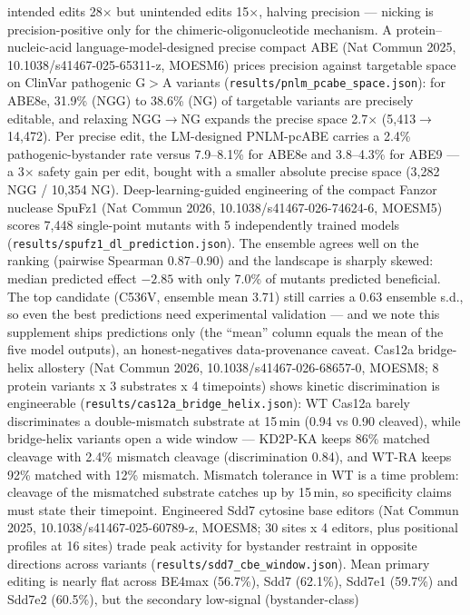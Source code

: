 \documentclass[12pt]{article}
\begin{document}
intended edits 28$\times$ but unintended edits 15$\times$, halving
precision --- nicking is precision-positive only for the
chimeric-oligonucleotide mechanism.
A protein--nucleic-acid language-model-designed precise compact ABE
(Nat Commun 2025, 10.1038/s41467-025-65311-z, MOESM6) prices precision
against targetable space on ClinVar pathogenic G$>$A variants
(\texttt{results/pnlm\_pcabe\_space.json}): for ABE8e, 31.9\%
(NGG) to 38.6\% (NG) of targetable variants are precisely editable, and
relaxing NGG$\to$NG expands the precise space 2.7$\times$
(5,413$\to$14,472). Per precise edit, the LM-designed PNLM-pcABE
carries a 2.4\% pathogenic-bystander rate versus 7.9--8.1\% for ABE8e
and 3.8--4.3\% for ABE9 --- a 3$\times$ safety gain per edit, bought
with a smaller absolute precise space (3,282 NGG / 10,354 NG).
Deep-learning-guided engineering of the compact Fanzor nuclease SpuFz1
(Nat Commun 2026, 10.1038/s41467-026-74624-6, MOESM5) scores 7,448
single-point mutants with 5 independently trained models
(\texttt{results/spufz1\_dl\_prediction.json}). The ensemble agrees
well on the ranking (pairwise Spearman 0.87--0.90) and the landscape is
sharply skewed: median predicted effect $-2.85$ with only 7.0\% of
mutants predicted beneficial. The top candidate (C536V, ensemble mean
3.71) still carries a 0.63 ensemble s.d., so even the best predictions
need experimental validation --- and we note this supplement ships
predictions only (the ``mean'' column equals the mean of the five model
outputs), an honest-negatives data-provenance caveat.
Cas12a bridge-helix allostery (Nat Commun 2026,
10.1038/s41467-026-68657-0, MOESM8; 8 protein variants x 3 substrates x
4 timepoints) shows kinetic discrimination is engineerable
(\texttt{results/cas12a\_bridge\_helix.json}): WT Cas12a barely
discriminates a double-mismatch substrate at 15\,min (0.94 vs 0.90
cleaved), while bridge-helix variants open a wide window --- KD2P-KA
keeps 86\% matched cleavage with 2.4\% mismatch cleavage
(discrimination 0.84), and WT-RA keeps 92\% matched with 12\%
mismatch. Mismatch tolerance in WT is a time problem: cleavage of the
mismatched substrate catches up by 15\,min, so specificity claims must
state their timepoint.
Engineered Sdd7 cytosine base editors (Nat Commun 2025,
10.1038/s41467-025-60789-z, MOESM8; 30 sites x 4 editors, plus
positional profiles at 16 sites) trade peak activity for bystander
restraint in opposite directions across variants
(\texttt{results/sdd7\_cbe\_window.json}). Mean primary editing is
nearly flat across BE4max (56.7\%), Sdd7 (62.1\%), Sdd7e1 (59.7\%)
and Sdd7e2 (60.5\%), but the secondary low-signal (bystander-class)
\end{document}
